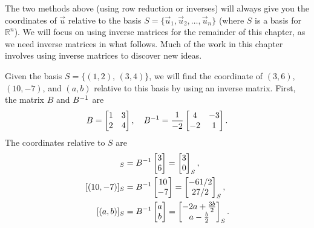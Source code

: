 The two methods above (using row reduction or inverses) will always give you the coordinates of $\vec u$ relative to the basis $S=\{\vec u_1,\vec u_2,\ldots,\vec u_n\}$ (where $S$ is a basis for ${\mathbb{R}}^n$). 
We will focus on using inverse matrices for the remainder of this chapter, as we need inverse matrices in what follows.  
Much of the work in this chapter involves using inverse matrices to discover new ideas. 


\begin{example} 
Given the basis $S=\{(1,2),\,(3,4)\}$, we will find the coordinate of $(3,6)$, $(10,-7)$, and $(a,b)$ relative to this basis by using an inverse matrix.  First, the matrix $B$ and $B^{-1}$ are
$$B=
\begin{bmatrix}
 1 & 3 \\
 2 & 4
\end{bmatrix},\quad
B^{-1}=
\displaystyle\frac{1}{-2}\begin{bmatrix}
 4 & -3 \\
 -2 & 1
\end{bmatrix}.$$
  The coordinates relative to $S$ are 
\begin{align*}
[(3,6)]_S&=B^{-1}\bm{3\\6} = \bm{3\\0}_S, \\
[(10,-7)]_S &= B^{-1}\bm{10\\-7}=\bm{-61/2\\27/2}_S,\\
[(a,b)]_S &= B^{-1}\bm{a\\b}=\bm{-2 a+\frac{3 b}{2} \\ a-\frac{b}{2}}_S.
\end{align*}

\end{example}



